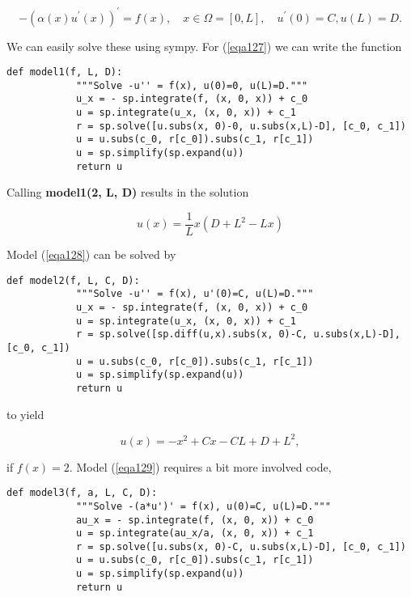 \documentclass[../main.tex]{subfiles}
\begin{document}
	\begin{equation}
		\label{eqa129}
		-\left(\alpha(x) u^{\prime}(x)\right)^{\prime}=f(x), \quad x \in \Omega=[0, L], \quad u^{\prime}(0)=C, u(L)=D .
	\end{equation}

	We can easily solve these using sympy. For (\ref{eqa127}) we can write the function
	
	\begin{lstlisting}[numbers=none]
		def model1(f, L, D):
			"""Solve -u'' = f(x), u(0)=0, u(L)=D."""
			u_x = - sp.integrate(f, (x, 0, x)) + c_0
			u = sp.integrate(u_x, (x, 0, x)) + c_1
			r = sp.solve([u.subs(x, 0)-0, u.subs(x,L)-D], [c_0, c_1])
			u = u.subs(c_0, r[c_0]).subs(c_1, r[c_1])
			u = sp.simplify(sp.expand(u))
			return u
	\end{lstlisting}
	
	\noindent Calling \textbf{model1(2, L, D)} results in the solution
	
	\begin{equation}
		\label{eqa130}
		u(x)=\frac{1}{L} x\left(D+L^{2}-L x\right)
	\end{equation}

	\noindent Model (\ref{eqa128}) can be solved by
	
	\begin{lstlisting}[numbers=none]
		def model2(f, L, C, D):
			"""Solve -u'' = f(x), u'(0)=C, u(L)=D."""
			u_x = - sp.integrate(f, (x, 0, x)) + c_0
			u = sp.integrate(u_x, (x, 0, x)) + c_1
			r = sp.solve([sp.diff(u,x).subs(x, 0)-C, u.subs(x,L)-D], [c_0, c_1])
			u = u.subs(c_0, r[c_0]).subs(c_1, r[c_1])
			u = sp.simplify(sp.expand(u))
			return u
	\end{lstlisting}
	
	\noindent to yield
	
	\begin{equation}
		\label{eqa131}
		u(x)=-x^{2}+C x-C L+D+L^{2},
	\end{equation}

	\noindent if $f(x)=2$. Model (\ref{eqa129}) requires a bit more involved code,
	
	
	\begin{lstlisting}[numbers=none]
		def model3(f, a, L, C, D):
			"""Solve -(a*u')' = f(x), u(0)=C, u(L)=D."""
			au_x = - sp.integrate(f, (x, 0, x)) + c_0
			u = sp.integrate(au_x/a, (x, 0, x)) + c_1
			r = sp.solve([u.subs(x, 0)-C, u.subs(x,L)-D], [c_0, c_1])
			u = u.subs(c_0, r[c_0]).subs(c_1, r[c_1])
			u = sp.simplify(sp.expand(u))
			return u
	\end{lstlisting}
	
\end{document}
